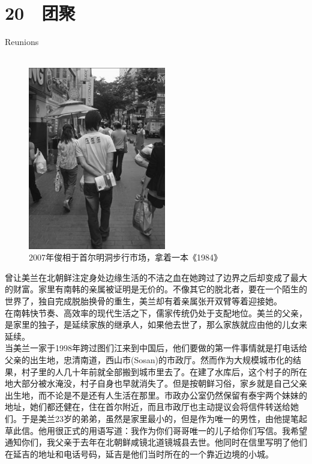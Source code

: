 \fancyhead[RO]{{\tiny{\textcolor{Gray}{\FA \ }}}\thepage}
\fancyhead[LE]{{\tiny{\textcolor{Gray}{\FA \ }}}\thepage}
\fancyfoot[LE,RO]{}
\fancyfoot[LO,CE]{}
\fancyfoot[CO,RE]{}
\chapter*{20 {\FA } 团聚}
\vspace{15mm}
\begin{flushright}
	\textcolor{PinYinColor}{\EN \huge{Reunions\\
	\ \\}}
\end{flushright}
\begin{figure}[!htbp]
\centering
\includegraphics[width=6cm]{./Chapters/Images/20.jpg}
\caption*{2007年俊相于首尔明洞步行市场，拿着一本《1984》}
\end{figure}

曾让美兰在北朝鲜注定身处边缘生活的不洁之血在她跨过了边界之后却变成了最大的财富。家里有南韩的亲属被证明是无价的。不像其它的脱北者，要在一个陌生的世界了，独自完成脱胎换骨的重生，美兰却有着亲属张开双臂等着迎接她。\\

在南韩快节奏、高效率的现代生活之下，儒家传统仍处于支配地位。美兰的父亲，是家里的独子，是延续家族的继承人，如果他去世了，那么家族就应由他的儿女来延续。\\

当美兰一家于1998年跨过图们江来到中国后，他们要做的第一件事情就是打电话给父亲的出生地，忠清南道，西山市(Sosan)的市政厅。然而作为大规模城市化的结果，村子里的人几十年前就全部搬到城市里去了。在建了水库后，这个村子的所在地大部分被水淹没，村子自身也早就消失了。但是按朝鲜习俗，家乡就是自己父亲出生地，而不论是不是还有人生活在那里。市政办公室仍然保留有泰宇两个妹妹的地址，她们都还健在，住在首尔附近，而且市政厅也主动提议会将信件转送给她们。于是美兰23岁的弟弟，虽然是家里最小的，但是作为唯一的男性，由他提笔起草此信。他用很正式的用语写道：我作为你们哥哥唯一的儿子给你们写信。我希望通知你们，我父亲于去年在北朝鲜咸镜北道镜城县去世。他同时在信里写明了他们在延吉的地址和电话号码，延吉是他们当时所在的一个靠近边境的小城。\\

